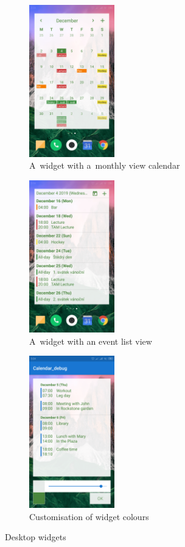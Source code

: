 \documentclass[a4paper, 11pt]{article}
\begin{document}
\begin{figure}[H]
\begin{minipage}{.74 \textwidth}
			\begin{subfigure}{.32 \textwidth}
				\centering
				\includegraphics[width=10em, frame]{img/widget_month.png}
				\caption{A~widget with a~monthly view calendar}
			\end{subfigure}
			\begin{subfigure}{.32 \textwidth}
				\centering
				\includegraphics[width=10em, frame]{img/widget_event_list.png}
				\caption{A~widget with an event list view}
			\end{subfigure}
			\begin{subfigure}{.32 \textwidth}
				\centering
				\includegraphics[width=10em, frame]{img/widget_customise.png}
				\caption{Customisation of widget colours}
			\end{subfigure}

			\caption{Desktop widgets}
			\label{fig:widgets}
		\end{minipage}
	\end{figure}
\end{document}
